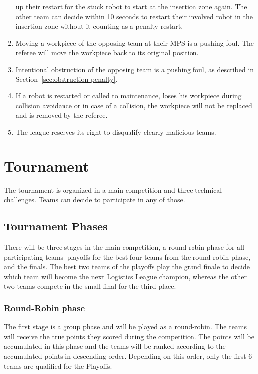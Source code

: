 \documentclass[12pt,twoside]{article}
\begin{document}
\begin{enumerate}
  up their restart for the stuck robot to start at the insertion zone
  again. The other team can decide within 10 seconds to restart their
  involved robot in the insertion zone without it counting as a
  penalty restart.
\item Moving a workpiece of the opposing team at their MPS is a pushing
foul. The referee will move the workpiece back to its original position.
\item Intentional obstruction of the opposing team is a pushing foul, as
described in Section~\ref{sec:obstruction-penalty}.
\item If a robot is restarted or called to maintenance, loses his
workpiece during collision avoidance or in case of a collision, the
workpiece will not be replaced and is removed by the referee.
\item The league reserves its right to disqualify clearly malicious
  teams.
\end{enumerate}

\section{Tournament}
\label{sec:tournament}
The tournament is organized in a main competition and three technical
challenges. Teams can decide to participate in any of those.

\subsection{Tournament Phases}
\label{sec:tournament-phases}
There will be three stages in the main competition, a round-robin
phase for all participating teams, playoffs for the best four teams
from the round-robin phase, and the finals. The best two teams of the
playoffs play the grand finale to decide which team will become the
next Logistics League champion, whereas the other two teams compete in
the small final for the third place.

\subsubsection{Round-Robin phase}
The first stage is a group phase and will be played as a round-robin. The teams
will receive the true points they scored during the competition. The points will
be accumulated in this phase and the teams will be ranked according to the
accumulated points in descending order. Depending on this order, only the first
6 teams are qualified for the Playoffs.
\end{document}
